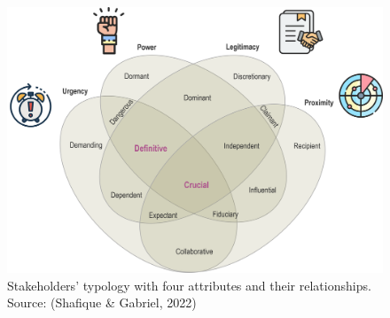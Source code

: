 \documentclass[authoryear,preprint,review,11pt,doubleblind]{elsarticle}
\begin{document}
    \begin{figure}[!h]
        \centering
        \includegraphics[width=0.8\columnwidth]{Figures/Shafique Stakeholders.png}
        \caption{Stakeholders' typology with four attributes and their relationships. Source: (Shafique \& Gabriel, 2022)}
        \label{fig:figure2}
    \end{figure}
\end{document}
